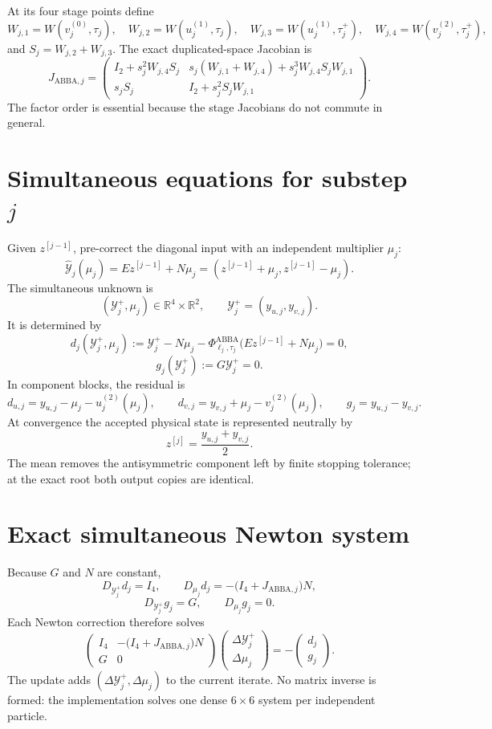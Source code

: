 \documentclass[11pt,a4paper]{article}
\newcommand{\R}{\mathbb{R}}
\newcommand{\Id}{I}
\newcommand{\Y}{\mathcal{Y}}
\newcommand{\PhiAB}{\Phi^{\mathrm{ABBA}}}
\begin{document}
At its four stage points define
\[
 W_{j,1}=W(v_j^{(0)},\tau_j),
 \quad
 W_{j,2}=W(u_j^{(1)},\tau_j),
 \quad
 W_{j,3}=W(u_j^{(1)},\tau_j^+),
 \quad
 W_{j,4}=W(v_j^{(2)},\tau_j^+),
\]
and $S_j=W_{j,2}+W_{j,3}$.  The exact duplicated-space Jacobian is
\[
 J_{\mathrm{ABBA},j}
 =\begin{pmatrix}
 \Id_2+s_j^2W_{j,4}S_j
 &s_j(W_{j,1}+W_{j,4})+s_j^3W_{j,4}S_jW_{j,1}\\[1mm]
 s_jS_j
 &\Id_2+s_j^2S_jW_{j,1}
 \end{pmatrix}.
\]
The factor order is essential because the stage Jacobians do not commute in
general.

\section{Simultaneous equations for substep \texorpdfstring{$j$}{j}}

Given $z^{[j-1]}$, pre-correct the diagonal input with an independent
multiplier $\mu_j$:
\[
 \widehat{\Y}_j(\mu_j)
 =Ez^{[j-1]}+N\mu_j
 =(z^{[j-1]}+\mu_j,z^{[j-1]}-\mu_j).
\]
The simultaneous unknown is
\[
 (\Y_j^+,\mu_j)\in\R^4\times\R^2,
 \qquad
 \Y_j^+=(y_{u,j},y_{v,j}).
\]
It is determined by
\[
 d_j(\Y_j^+,\mu_j)
 :=\Y_j^+-N\mu_j
 -\PhiAB_{\ell_j,\tau_j}
   \bigl(Ez^{[j-1]}+N\mu_j\bigr)=0,
\]
\[
 g_j(\Y_j^+):=G\Y_j^+=0.
\]
In component blocks, the residual is
\[
 d_{u,j}=y_{u,j}-\mu_j-u_j^{(2)}(\mu_j),
 \qquad
 d_{v,j}=y_{v,j}+\mu_j-v_j^{(2)}(\mu_j),
 \qquad
 g_j=y_{u,j}-y_{v,j}.
\]
At convergence the accepted physical state is represented neutrally by
\[
 z^{[j]}=\frac{y_{u,j}+y_{v,j}}{2}.
\]
The mean removes the antisymmetric component left by finite stopping tolerance;
at the exact root both output copies are identical.

\section{Exact simultaneous Newton system}

Because $G$ and $N$ are constant,
\[
 D_{\Y_j^+}d_j=\Id_4,
 \qquad
 D_{\mu_j}d_j
 =-\bigl(\Id_4+J_{\mathrm{ABBA},j}\bigr)N,
\]
\[
 D_{\Y_j^+}g_j=G,
 \qquad
 D_{\mu_j}g_j=0.
\]
Each Newton correction therefore solves
\[
 \boxed{
 \begin{pmatrix}
  \Id_4&-\bigl(\Id_4+J_{\mathrm{ABBA},j}\bigr)N\\[1mm]
  G&0
 \end{pmatrix}
 \begin{pmatrix}
  \Delta\Y_j^+\\
  \Delta\mu_j
 \end{pmatrix}
 =-
 \begin{pmatrix}
  d_j\\g_j
 \end{pmatrix}.
 }
 \tag{1}
\]
The update adds $(\Delta\Y_j^+,\Delta\mu_j)$ to the current iterate.  No
matrix inverse is formed: the implementation solves one dense $6\times6$
system per independent particle.
\end{document}
